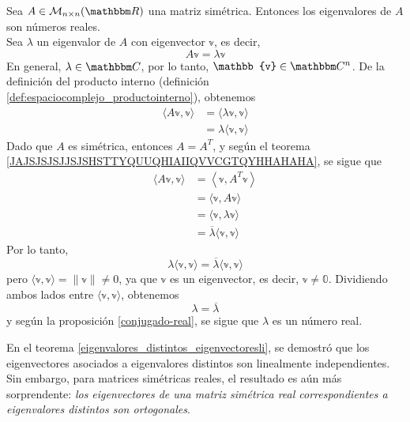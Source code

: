 \begin{theorem}\label{theorem_simetrica1}
    Sea $A \in \mathcal{M}_{n \times n}(\RR)$ una matriz simétrica. Entonces los eigenvalores de $A$ son números reales. \\
    \demostracion Sea $\lambda$ un eigenvalor de $A$ con eigenvector $\mathbb{v}$, es decir,
    $$A\mathbb{v} = \lambda \mathbb{v}$$\newpage\noindent
    En general, $\lambda \in \CC$, por lo tanto, $\mathbb{v} \in \CC[n]$. De la definición del producto interno (definición \ref{def:espaciocomplejo_productointerno}), obtenemos
    \begin{align*}
        \langle A\mathbb{v}, \mathbb{v} \rangle & = \langle \lambda \mathbb{v}, \mathbb{v} \rangle \\
        & = \lambda \langle \mathbb{v}, \mathbb{v} \rangle
    \end{align*}
    Dado que $A$ es simétrica, entonces $A = A^T$, y según el teorema \ref{JAJSJSJSJJSJSHSTTYQUUQHIAIIQVVCGTQYHHAHAHA}, se sigue que
    \begin{align*}
        \langle A\mathbb{v}, \mathbb{v} \rangle & = \left\langle \mathbb{v}, A^T \mathbb{v} \right\rangle \\
        & = \langle \mathbb{v}, A\mathbb{v} \rangle \\
        & = \langle \mathbb{v}, \lambda \mathbb{v} \rangle \\
        & = \overline{\lambda} \langle \mathbb{v}, \mathbb{v} \rangle
    \end{align*}
    Por lo tanto,
    $$\lambda \langle \mathbb{v}, \mathbb{v} \rangle = \overline{\lambda} \langle \mathbb{v}, \mathbb{v} \rangle$$
    pero $\langle \mathbb{v}, \mathbb{v} \rangle = \| \mathbb{v} \| \neq 0$, ya que $\mathbb{v}$ es un eigenvector, es decir, $\mathbb{v} \neq \mathbb{0}$. Dividiendo ambos lados entre $\langle \mathbb{v}, \mathbb{v} \rangle$, obtenemos
    $$\lambda = \overline{\lambda}$$
    y según la proposición \ref{conjugado-real}, se sigue que $\lambda$ es un número real.
\end{theorem}

En el teorema \ref{eigenvalores_distintos_eigenvectoresli}, se demostró que los eigenvectores asociados a eigenvalores distintos son linealmente independientes. Sin embargo, para matrices simétricas reales, el resultado es aún más sorprendente: \emph{los eigenvectores de una matriz simétrica real correspondientes a eigenvalores distintos son ortogonales}.

